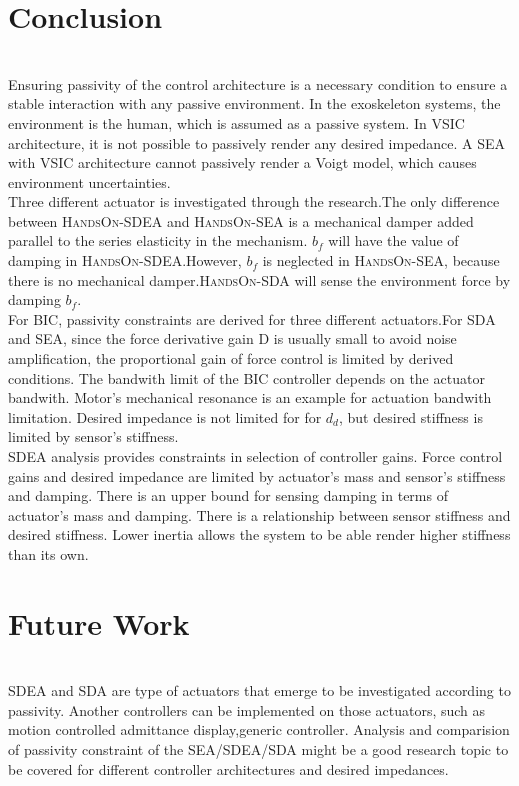 \documentclass[a4paper,12pt]{article}
\begin{document}
\section{Conclusion}\\
Ensuring passivity of the control architecture is a necessary condition to ensure a stable interaction with any passive environment. In the exoskeleton systems, the environment is the human, which is assumed as a passive system\cite{hogan}. In VSIC architecture, it is not possible to passively render any desired impedance. A SEA with VSIC architecture cannot passively render a Voigt model\cite{tagliamonte}, which causes environment uncertainties\cite{calanca}.\\

Three different actuator is investigated through the research.The only difference between \textsc{HandsOn-SDEA} and \textsc{HandsOn-SEA} is a mechanical damper added parallel to the series elasticity in the mechanism. $b_f$ will have the value of damping in \textsc{HandsOn-SDEA}.However, $b_f$ is neglected in \textsc{HandsOn-SEA}, because there is no mechanical damper.\textsc{HandsOn-SDA} will sense the environment force by damping $b_f$.\\

For BIC, passivity constraints are derived for three different actuators.For SDA and SEA, since the force derivative gain D is usually small to avoid noise amplification, the proportional gain of force control is limited by derived conditions. The bandwith limit of the BIC controller depends on the actuator bandwith. Motor's mechanical resonance is an example for actuation bandwith limitation. Desired impedance is not limited for for $d_d$, but desired stiffness is limited by sensor's stiffness.\\

SDEA analysis provides constraints in selection of controller gains. Force control gains and desired impedance are limited by actuator's mass and sensor's stiffness and damping. There is an upper bound for sensing damping in terms of actuator's mass and damping. There is a relationship between sensor stiffness and desired stiffness. Lower inertia allows the system to be able render higher stiffness than its own.\\



\section{Future Work}\\
SDEA and SDA are type of actuators that emerge to be investigated according to passivity. Another controllers can be implemented on those actuators, such as motion controlled admittance display,generic controller. Analysis and comparision of passivity constraint of the SEA/SDEA/SDA might be a good research topic to be covered for different controller architectures and desired impedances.
\end{document}
